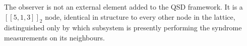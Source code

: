 \documentclass[11pt,a4paper]{article}
\newcommand{\Cq}[4]{[\![#1,#2,#3]\!]_{#4}}
\begin{document}
\medskip\noindent
The observer is not an external element added to the QSD framework. It is a $\Cq{5}{1}{3}{2}$ node, identical in structure to every other node in the lattice, distinguished only by which subsystem is presently performing the syndrome measurements on its neighbours.



\end{document}
